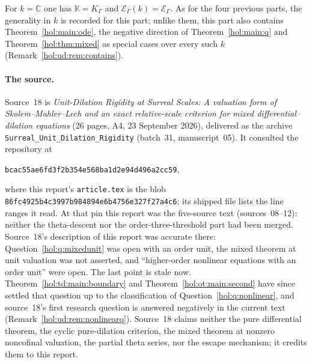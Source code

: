 \documentclass[11pt]{article}
\numberwithin{equation}{section}
\theoremstyle{definition}
\theoremstyle{remark}
\newcommand{\C}{\mathbb C}
\newcommand{\K}{K_\Gamma}
\newcommand{\E}{\mathcal E_\Gamma}
\newcommand{\KK}{\mathbb K}
\newcommand{\EK}{\mathcal E_\Gamma(k)}
\begin{document}
For $k=\C$ one has $\KK=\K$ and $\EK=\E$. As for the four previous parts,
the generality in $k$ is recorded for this part; unlike them, this part also
contains Theorem~\ref{hol:main:ode}, the negative direction of
Theorem~\ref{hol:main:q} and Theorem~\ref{hol:thm:mixed} as special cases over
every such $k$ (Remark~\ref{hol:ud:rem:contains}).

\paragraph{The source.}
Source~18 is \emph{Unit-Dilation Rigidity at Surreal Scales: A valuation form
of Skolem--Mahler--Lech and an exact relative-scale criterion for mixed
differential--dilation equations} (26 pages, A4, 23 September 2026), delivered
as the archive \texttt{Surreal\_Unit\_Dilation\_Rigidity} (batch~31,
manuscript~05). It consulted the repository at
\begin{center}\small\texttt{bcac55ae6fd3f2b354e568ba1d2e94d496a2cc59},\end{center}
where this report's \texttt{article.tex} is the blob
\texttt{86fc4925b4c3997b984894e6b4756e327f27a4c6}; its shipped file
 lists the line ranges it read. At
that pin this report was the five-source text (sources~08--12): neither the
theta-descent nor the order-three-threshold part had been merged. Source~18's
description of this report was accurate there: Question~\ref{hol:q:mixedunit}
was open with an order unit, the mixed theorem at unit valuation was not
asserted, and ``higher-order nonlinear equations with an order unit'' were
open. The last point is stale now. Theorem~\ref{hol:td:main:boundary} and
Theorem~\ref{hol:ot:main:second} have since settled that question up to the
classification of Question~\ref{hol:q:nonlinear}, and source~18's first
research question is answered negatively in the current text
(Remark~\ref{hol:ud:rem:nonlinearq}). Source~18 claims neither the pure
differential theorem, the cyclic pure-dilation criterion, the mixed theorem at
nonzero noncofinal valuation, the partial theta series, nor the escape
mechanism; it credits them to this report.
\end{document}
